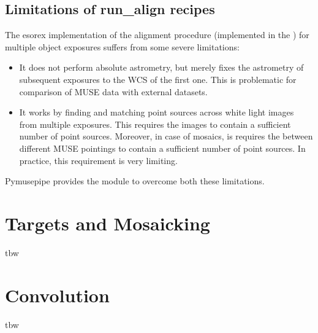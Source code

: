 \documentclass[letterpaper,10pt,english]{sphinxmanual}
\begin{document}
\subsection{Limitations of run\_align recipes}
\label{\detokenize{alignment:limitations-of-run-align-recipes}}
\sphinxAtStartPar
The esorex implementation of the alignment procedure (implemented in
the {\hyperref[\detokenize{api/pymusepipe:pymusepipe.prep_recipes_pipe.PipePrep.run_align_bydataset}]{}})
for multiple object exposures suffers from some severe limitations:
\begin{itemize}
\item {} 
\sphinxAtStartPar
It does not perform absolute astrometry, but merely fixes the astrometry of
subsequent exposures to the WCS of the first one. This is problematic for comparison of MUSE
data with external datasets.

\item {} 
\sphinxAtStartPar
It works by finding and matching point sources across white light images from
multiple exposures. This requires the images to contain a sufficient number of point sources.
Moreover, in case of mosaics, is requires the  between different MUSE pointings
to contain a sufficient number of point sources. In practice, this requirement is very limiting.

\end{itemize}

\sphinxAtStartPar
Pymusepipe provides the {\hyperref[\detokenize{api/pymusepipe:module-pymusepipe.align_pipe}]{}} module to overcome both these limitations.

\sphinxstepscope


\section{Targets and Mosaicking}
\label{\detokenize{mosaicking:targets-and-mosaicking}}\label{\detokenize{mosaicking::doc}}
\sphinxAtStartPar
tbw

\sphinxstepscope


\section{Convolution}
\label{\detokenize{convolution:convolution}}\label{\detokenize{convolution::doc}}
\sphinxAtStartPar
tbw
\end{document}
